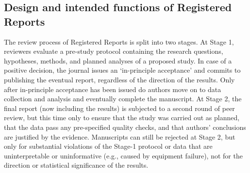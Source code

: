 \documentclass[
  ,man,mask,floatsintext]{apa6}
\begin{document}
\hypertarget{design-and-intended-functions-of-registered-reports}{%
\subsection{Design and intended functions of Registered Reports}\label{design-and-intended-functions-of-registered-reports}}

The review process of Registered Reports is split into two stages.
At Stage 1, reviewers evaluate a pre-study protocol containing the research questions, hypotheses, methods, and planned analyses of a proposed study.
In case of a positive decision, the journal issues an `in-principle acceptance' and commits to publishing the eventual report, regardless of the direction of the results.
Only after in-principle acceptance has been issued do authors move on to data collection and analysis and eventually complete the manuscript.
At Stage 2, the final report (now including the results) is subjected to a second round of peer review, but this time only to ensure that the study was carried out as planned, that the data pass any pre-specified quality checks, and that authors' conclusions are justified by the evidence.
Manuscripts can still be rejected at Stage 2, but only for substantial violations of the Stage-1 protocol or data that are uninterpretable or uninformative (e.g., caused by equipment failure), not for the direction or statistical significance of the results.
\end{document}
